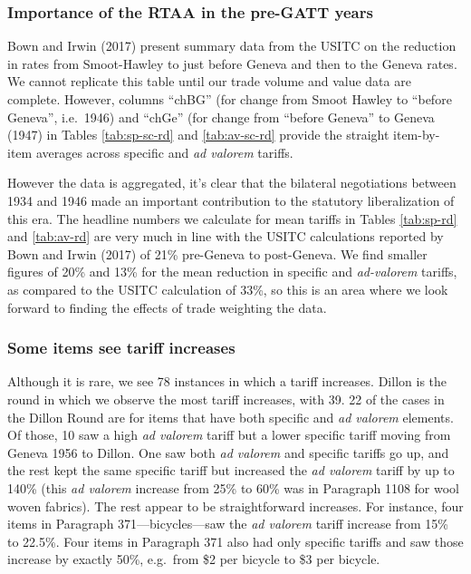 \documentclass[
  12pt,
]{article}
\begin{document}
\hypertarget{importance-of-the-rtaa-in-the-pre-gatt-years}{%
\subsubsection{Importance of the RTAA in the pre-GATT years}\label{importance-of-the-rtaa-in-the-pre-gatt-years}}

Bown and Irwin (2017) present summary data from the USITC on the reduction in rates from Smoot-Hawley to just before Geneva and then to the Geneva rates. We cannot replicate this table until our trade volume and value data are complete.
However, columns ``chBG'' (for change from Smoot Hawley to ``before Geneva'', i.e.~1946) and ``chGe'' (for change from ``before Geneva'' to Geneva (1947) in Tables \ref{tab:sp-sc-rd} and \ref{tab:av-sc-rd} provide the straight item-by-item averages across specific and \emph{ad valorem} tariffs.

However the data is aggregated, it's clear that the bilateral negotiations between 1934 and 1946 made an important contribution to the statutory liberalization of this era. The headline numbers we calculate for mean tariffs in Tables \ref{tab:sp-rd} and \ref{tab:av-rd} are very much in line with the USITC calculations reported by Bown and Irwin (2017) of 21\% pre-Geneva to post-Geneva. We find smaller figures of 20\% and 13\% for the mean reduction in specific and \emph{ad-valorem} tariffs, as compared to the USITC calculation of 33\%, so this is an area where we look forward to finding the effects of trade weighting the data.

\hypertarget{some-items-see-tariff-increases}{%
\subsubsection{Some items see tariff increases}\label{some-items-see-tariff-increases}}

Although it is rare, we see 78 instances in which a tariff increases. Dillon is the round in which we observe the most tariff increases, with 39. 22 of the cases in the Dillon Round are for items that have both specific and \emph{ad valorem} elements. Of those, 10 saw a high \emph{ad valorem} tariff but a lower specific tariff moving from Geneva 1956 to Dillon. One saw both \emph{ad valorem} and specific tariffs go up, and the rest kept the same specific tariff but increased the \emph{ad valorem} tariff by up to 140\% (this \emph{ad valorem} increase from 25\% to 60\% was in Paragraph 1108 for wool woven fabrics). The rest appear to be straightforward increases. For instance, four items in Paragraph 371---bicycles---saw the \emph{ad valorem} tariff increase from 15\% to 22.5\%. Four items in Paragraph 371 also had only specific tariffs and saw those increase by exactly 50\%, e.g.~from \$2 per bicycle to \$3 per bicycle.
\end{document}
